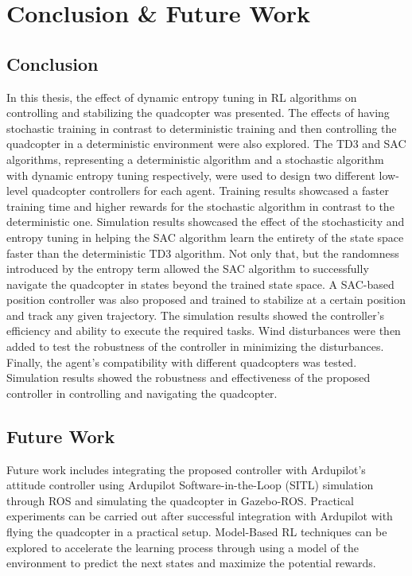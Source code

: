 \chapter{Conclusion \& Future Work}
\section{Conclusion}
   In this thesis, the effect of dynamic entropy tuning in RL algorithms on controlling and stabilizing the quadcopter was presented. The effects of having stochastic training in contrast to deterministic training and then controlling the quadcopter in a deterministic environment were also explored. The TD3 and SAC algorithms, representing a deterministic algorithm and a stochastic algorithm with dynamic entropy tuning respectively, were used to design two different low-level quadcopter controllers for each agent. Training results showcased a faster training time and higher rewards for the stochastic algorithm in contrast to the deterministic one. Simulation results showcased the effect of the stochasticity and entropy tuning in helping the SAC algorithm learn the entirety of the state space faster than the deterministic TD3 algorithm. Not only that, but the randomness introduced by the entropy term allowed the SAC algorithm to successfully navigate the quadcopter in states beyond the trained state space. A SAC-based position controller was also proposed and trained to stabilize at a certain position and track any given trajectory. The simulation results showed the controller's efficiency and ability to execute the required tasks. Wind disturbances were then added to test the robustness of the controller in minimizing the disturbances. Finally, the agent's compatibility with different quadcopters was tested. Simulation results showed the robustness and effectiveness of the proposed controller in controlling and navigating the quadcopter.\clearpage
   
   \section{Future Work}
   Future work includes integrating the proposed controller with Ardupilot's attitude controller using Ardupilot Software-in-the-Loop (SITL) simulation through ROS and simulating the quadcopter in Gazebo-ROS. Practical experiments can be carried out after successful integration with Ardupilot with flying the quadcopter in a practical setup. Model-Based RL techniques can be explored to accelerate the learning process through using a model of the environment to predict the next states and maximize the potential rewards.
\clearpage